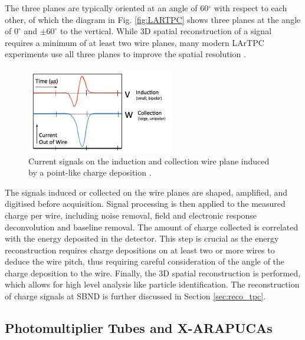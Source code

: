 The three planes are typically oriented at an angle of 60$^{\circ}$ with respect to each other, of which the diagram in Fig. \ref{fig:LARTPC} shows three planes at the angle of $0^{\circ}$ and $\pm60^{\circ}$ to the vertical.
While 3D spatial reconstruction of a signal requires a minimum of at least two wire planes, many modern LArTPC experiments use all three planes to improve the spatial resolution \cite{argoneut, icarus_det, ubooneDet, sbnd_det, protodune, dunefd_det}.

\begin{figure}[ht] 
\centering    
\includegraphics[width=0.57\textwidth]{wire_current}
\caption[Induced Currents on an Induction and a Collection Wire Plane]{
Current signals on the induction and collection wire plane induced by a point-like charge deposition \cite{argoneut}.
\hfill
\break
}
\label{fig:wire_current}
\end{figure}


The signals induced or collected on the wire planes are shaped, amplified, and digitised before acquisition.
Signal processing is then applied to the measured charge per wire, including noise removal, field and electronic response deconvolution and baseline removal.
The amount of charge collected is correlated with the energy deposited in the detector.
This step is crucial as the energy reconstruction requires charge depositions on at least two or more wires to deduce the wire pitch, thus requiring careful consideration of the angle of
 the charge deposition to the wire.
Finally, the 3D spatial reconstruction is performed, which allows for high level analysis like particle identification.
The reconstruction of charge signals at SBND is further discussed in Section \ref{sec:reco_tpc}.

\subsection{Photomultiplier Tubes and X-ARAPUCAs}
\label{sec:pmtarapuca}


